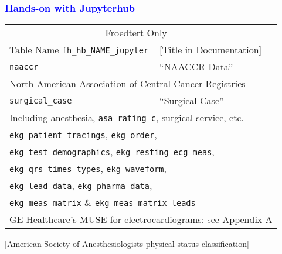 \documentclass[11pt,pdftex,dvipsnames,usenames]{beamer}
\begin{document}
\begin{frame}[fragile]\frametitle{\bf\textcolor{blue}{Hands-on with Jupyterhub}}
\begin{tabular}{lll}
\multicolumn{2}{c}{Froedtert Only} \\
Table Name \texttt{fh\_hb\_NAME\_jupyter} & 
\textcolor{PineGreen}{[\href{https://ctri.mcw.edu/wp-content/uploads/CTSI-Honest-Broker-Data-Dictionary.pdf}{Title in Documentation}]} \\ \hline
\texttt{naaccr}       & ``NAACCR Data'' \\ 
\multicolumn{3}{l}{North American Association of Central Cancer Registries} \\ \hline 
\texttt{surgical\_case}       & ``Surgical Case'' \\ 
\multicolumn{3}{l}{Including anesthesia, \texttt{asa\_rating\_c}, surgical service, etc.} \\ \hline
\multicolumn{2}{l}{\texttt{ekg\_patient\_tracings}, \texttt{ekg\_order},} \\
\multicolumn{2}{l}{\texttt{ekg\_test\_demographics}, \texttt{ekg\_resting\_ecg\_meas},} \\
\multicolumn{2}{l}{\texttt{ekg\_qrs\_times\_types}, \texttt{ekg\_waveform},} \\
\multicolumn{2}{l}{\texttt{ekg\_lead\_data}, \texttt{ekg\_pharma\_data},} \\
\multicolumn{2}{l}{\texttt{ekg\_meas\_matrix} \& \texttt{ekg\_meas\_matrix\_leads}} \\
\multicolumn{3}{l}{GE Healthcare's MUSE for electrocardiograms: see Appendix A} \\ \hline
\end{tabular}
\textcolor{PineGreen}{[\href{https://www.ncbi.nlm.nih.gov/books/NBK441940}{American Society of Anesthesiologists physical status classification}]}
\end{frame}
\end{document}
